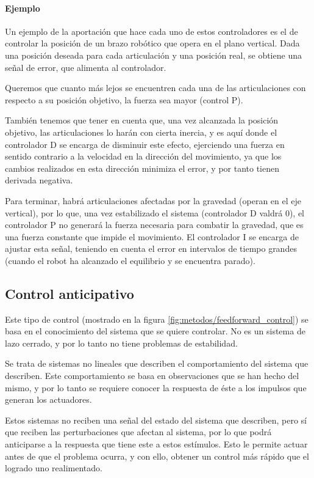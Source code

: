 \paragraph{Ejemplo}
Un ejemplo de la aportación que hace cada uno de estos controladores es el de controlar la posición de un brazo robótico que opera en el plano vertical. Dada una posición deseada para cada articulación y una posición real, se obtiene una señal de error, que alimenta al controlador.

Queremos que cuanto más lejos se encuentren cada una de las articulaciones con respecto a su posición objetivo, la fuerza sea mayor (control P).

También tenemos que tener en cuenta que, una vez alcanzada la posición objetivo, las articulaciones lo harán con cierta inercia, y es aquí donde el controlador D se encarga de disminuir este efecto, ejerciendo una fuerza en sentido contrario a la velocidad en la dirección del movimiento, ya que los cambios realizados en esta dirección minimiza el error, y por tanto tienen derivada negativa.

Para terminar, habrá articulaciones afectadas por la gravedad (operan en el eje vertical), por lo que, una vez estabilizado el sistema (controlador D valdrá 0), el controlador P no generará la fuerza necesaria para combatir la gravedad, que es una fuerza constante que impide el movimiento. El controlador I se encarga de ajustar esta señal, teniendo en cuenta el error en intervalos de tiempo grandes (cuando el robot ha alcanzado el equilibrio y se encuentra parado).


\subsection{Control anticipativo}
Este tipo de control (mostrado en la figura \ref{fig:metodos/feedforward_control}) se basa en el conocimiento del sistema que se quiere controlar. No es un sistema de lazo cerrado, y por lo tanto no tiene problemas de estabilidad.

Se trata de sistemas no lineales que describen el comportamiento del sistema que describen. Este comportamiento se basa en observaciones que se han hecho del mismo, y por lo tanto se requiere conocer la respuesta de éste a los impulsos que generan los actuadores.

Estos sistemas no reciben una señal del estado del sistema que describen, pero sí que reciben las perturbaciones que afectan al sistema, por lo que podrá anticiparse a la respuesta que tiene este a estos estímulos. Esto le permite actuar antes de que el problema ocurra, y con ello, obtener un control más rápido que el logrado uno realimentado.

